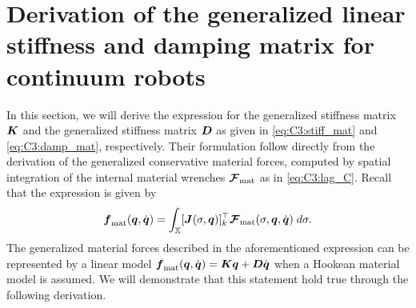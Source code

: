 \section{Derivation of the generalized linear stiffness and damping matrix for continuum robots}
\label{app:C3:linearmaterialmatrices}
In this section, we will derive the expression for the generalized stiffness matrix ${\boldsymbol{K}}$ and the generalized stiffness matrix ${\boldsymbol{D}}$ as given in \eqref{eq:C3:stiff_mat} and \eqref{eq:C3:damp_mat}, respectively. Their formulation follow directly from the derivation of the generalized conservative material forces, computed by spatial integration of the internal material wrenches $\boldsymbol{\mathcal{F}}_{\textrm{mat}}$ as in \eqref{eq:C3:lag_C}. Recall that the expression is given by
%
\begin{equation}
{\boldsymbol{f}}_{\textrm{mat}}({\boldsymbol{q}},{\dot{\boldsymbol{q}}}) = \int_{\mathbb{X}} [{\boldsymbol{J}}(\sigma,{\boldsymbol{q}})]_k^\top {\boldsymbol{\mathcal{F}}}_\textrm{mat}(\sigma,{\boldsymbol{q}},{\dot{\boldsymbol{q}}}) \; d\sigma. \label{eq:app_gen_materialforces}
\end{equation}
%
The generalized material forces described in the aforementioned expression can be represented by a linear model ${\boldsymbol{f}}_{\textrm{mat}}({\boldsymbol{q}},{\dot{\boldsymbol{q}}}) = {\boldsymbol{K}} {\boldsymbol{q}} + {\boldsymbol{D}} {\dot{\boldsymbol{q}}}$ when a Hookean material model is assumed. We will demonstrate that this statement hold true through the following derivation.

